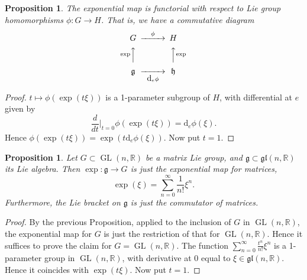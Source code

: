 \documentclass{article}
\newtheorem{proposition}[theorem]{Proposition}
\theoremstyle{remark}
\newcommand{\R}{\mathbb{R}}
\newcommand\lie[1]{\mathfrak{#1}}
\newcommand{\h}{\lie{h}}
\newcommand{\g}{\lie{g}}
\newcommand{\on}{\operatorname}
\newcommand{\GL}{ \on{GL}}
\renewcommand{\d}{{\mbox{d}}}
\newcommand{\f}{\frac}
\newcommand{\mf}{\mathfrak}
\begin{document}
\begin{proposition}
The exponential map is functorial with respect to Lie group homomorphisms
$\phi\colon G\to H$. That is, we have a commutative diagram 
\[ \begin{CD} G @>{\phi}>> H \\
@A{\exp}AA @AA{\exp}A \\
\g @>>{\d_e\phi}> \h
\end{CD}\]
%
\end{proposition}
\begin{proof}
$t\mapsto \phi(\exp(t\xi))$ is a 1-parameter subgroup of $H$, with differential at $e$ given by 
\[ \f{d}{d t}\Big|_{t=0} \phi(\exp(t\xi))=\d_e\phi(\xi).\]
Hence $ \phi(\exp(t\xi))=\exp(t \d_e\phi(\xi))$. Now put $t=1$. 
\end{proof}

\begin{proposition}
%
Let $G\subset \GL(n,\R)$ be a matrix Lie group, and $\g\subset \mf{gl}(n,\R)$ its Lie algebra. 
Then $\exp\colon \g\to G$ is just the exponential map for matrices, 
\[ \exp(\xi)=\sum_{n=0}^\infty \f{1}{n!}\xi^n.\]
Furthermore, the Lie bracket on $\g$ is just the commutator of matrices.
\end{proposition}
\begin{proof}
By the previous Proposition, applied to the inclusion of $G$ in
$\GL(n,\R)$, the exponential map for $G$ is just the restriction of
that for $\GL(n,\R)$.  Hence it suffices to prove the claim for
$G=\GL(n,\R)$.  The function $\sum_{n=0}^\infty \f{t^n}{n!}\xi^n$ is a
1-parameter group in $\GL(n,\R)$, with derivative at $0$ equal to
$\xi\in \mf{gl}(n,\R)$.  Hence it coincides with $\exp(t\xi)$. Now put
$t=1$.
\end{proof}
\end{document}
